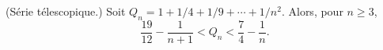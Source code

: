 (Série télescopique.) Soit $Q_n = 1 + 1/4 + 1/9 + \cdots + 1/n^2$. Alors, pour $n \geq 3$,
\[ \frac{19}{12} - \frac{1}{n + 1} < Q_n < \frac{7}{4} - \frac{1}{n}. \]
